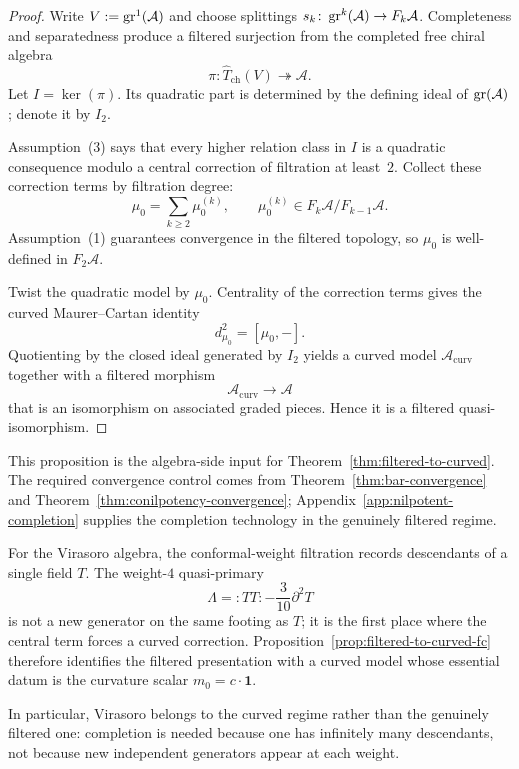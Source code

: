 \begin{proof}
Write $V := \operatorname{gr}^1(\mathcal{A})$ and choose splittings
$s_k \colon \operatorname{gr}^k(\mathcal{A}) \to F_k\mathcal{A}$.  Completeness and
separatedness produce a filtered surjection from the completed free chiral
algebra
\[
\pi \colon \widehat{T}_{\mathrm{ch}}(V)\twoheadrightarrow \mathcal{A}.
\]
Let $I = \ker(\pi)$.  Its quadratic part is determined by the defining
ideal of $\operatorname{gr}(\mathcal{A})$; denote it by $I_2$.

Assumption~(3) says that every higher relation class in $I$ is a quadratic
consequence modulo a central correction of filtration at least~$2$.  Collect
these correction terms by filtration degree:
\[
\mu_0 = \sum_{k \ge 2}\mu_0^{(k)}, \qquad
\mu_0^{(k)} \in F_k\mathcal{A}/F_{k-1}\mathcal{A}.
\]
Assumption~(1) guarantees convergence in the filtered topology, so $\mu_0$ is
well-defined in $F_2\mathcal{A}$.

Twist the quadratic model by $\mu_0$.  Centrality of the correction terms
gives the curved Maurer--Cartan identity
\[
d_{\mu_0}^2 = [\mu_0,-].
\]
Quotienting by the closed ideal generated by $I_2$ yields a curved model
$\mathcal{A}_{\mathrm{curv}}$ together with a filtered morphism
\[
\mathcal{A}_{\mathrm{curv}} \to \mathcal{A}
\]
that is an isomorphism on associated graded pieces.  Hence it is a filtered
quasi-isomorphism.
\end{proof}

\begin{remark}[Dependencies]
This proposition is the algebra-side input for
Theorem~\ref{thm:filtered-to-curved}.  The required convergence control comes
from Theorem~\ref{thm:bar-convergence} and
Theorem~\ref{thm:conilpotency-convergence}; Appendix~\ref{app:nilpotent-completion}
supplies the completion technology in the genuinely filtered regime.
\end{remark}

\begin{example}\label{ex:vir-filtered-to-curved-fc}
For the Virasoro algebra, the conformal-weight filtration records descendants
of a single field $T$.  The weight-$4$ quasi-primary
\[
\Lambda = {:}TT{:} - \frac{3}{10}\partial^2 T
\]
is not a new generator on the same footing as $T$; it is the first place where
the central term forces a curved correction.  Proposition~\ref{prop:filtered-to-curved-fc}
therefore identifies the filtered presentation with a curved model whose
essential datum is the curvature scalar $m_0 = c \cdot \mathbf{1}$.

In particular, Virasoro belongs to the curved regime rather than the genuinely
filtered one: completion is needed because one has infinitely many descendants,
not because new independent generators appear at each weight.
\end{example}

